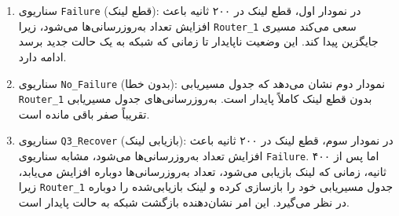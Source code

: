 \documentclass[a4paper]{article}
\begin{document}
\begin{enumerate}
    \begin{enumerate}
        \item سناریوی \texttt{Failure} (قطع لینک):
        در نمودار اول، قطع لینک در ۲۰۰ ثانیه باعث افزایش تعداد به‌روزرسانی‌ها
        می‌شود، زیرا \texttt{Router\_1} سعی می‌کند مسیری جایگزین پیدا کند. این
        وضعیت ناپایدار تا زمانی که شبکه به یک حالت جدید برسد ادامه دارد.
        \item سناریوی \texttt{No\_Failure} (بدون خطا): نمودار دوم نشان می‌دهد که
        جدول مسیریابی \texttt{Router\_1} بدون قطع لینک کاملاً پایدار است.
        به‌روزرسانی‌های جدول مسیریابی تقریباً صفر باقی مانده است.
        \item سناریوی \texttt{Q3\_Recover} (بازیابی لینک):
        در نمودار سوم، قطع لینک در ۲۰۰ ثانیه باعث افزایش تعداد به‌روزرسانی‌ها
        می‌شود، مشابه سناریوی \texttt{Failure}. اما پس از ۴۰۰ ثانیه، زمانی که
        لینک بازیابی می‌شود، تعداد به‌روزرسانی‌ها دوباره افزایش می‌یابد، زیرا
        \texttt{Router\_1} جدول مسیریابی خود را بازسازی کرده و لینک بازیابی‌شده
        را دوباره در نظر می‌گیرد. این امر نشان‌دهنده بازگشت شبکه به حالت پایدار
        است.
    \end{enumerate}
\end{enumerate}
\end{document}
